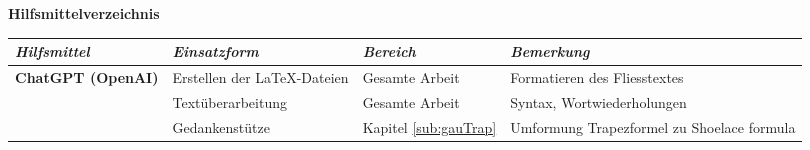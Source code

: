 
\huge\textbf{Hilfsmittelverzeichnis}

\newcommand{\tabTitle}[1]{\textbf{\textit{\large #1}}}
\renewcommand{\arraystretch}{1.5} %

\begin{table}[H]
    \centering
    \begin{tabularx}{\textwidth}{|l|X|X|X|}
        \hline
        \tabTitle{Hilfsmittel} & \tabTitle{Einsatzform} & \tabTitle{Bereich} & \tabTitle{Bemerkung} \\
        \hline

        \textbf{ChatGPT (OpenAI)} & Erstellen der LaTeX-Dateien & Gesamte Arbeit & Formatieren des Fliesstextes \\
         & Textüberarbeitung & Gesamte Arbeit & Syntax, Wortwiederholungen \\ 
         & Gedankenstütze & Kapitel \ref{sub:gauTrap} & Umformung Trapezformel zu Shoelace formula \cite{oai:chatgpt} \\
        \hline
    \end{tabularx}
        \label{tab:tools}
\end{table}

\renewcommand{\arraystretch}{1.0}